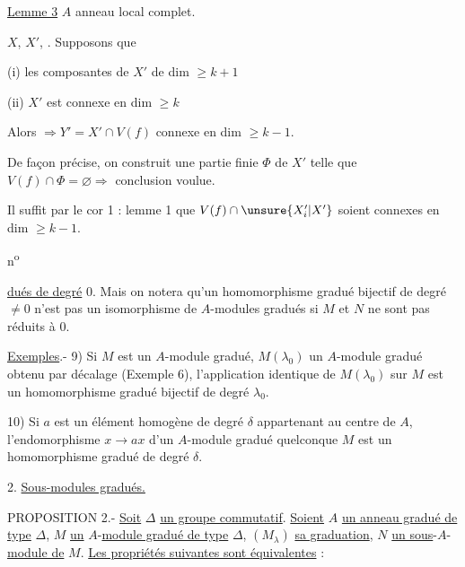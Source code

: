\uline{Lemme 3} \quad $A$ anneau local   complet. 

$X$, $X'$, \deleted{[$Y'=V(f)\cap X'$]}. Supposons  que

(i) les composantes de $X'$ de dim $\geq k+1$

(ii) $X'$ est connexe en dim $\geq k$

Alors   $\Longrightarrow Y'=X'\cap V(f)$   connexe en dim $\geq k-1$.

De façon précise, on construit une partie finie $\Phi$ de $X'$ telle que $V(f)\cap\Phi=\varnothing\Longrightarrow$ conclusion voulue.

Il suffit par le cor 1 : lemme 1 que $V(f)\cap\unsure{X'_i|X'}$ soient connexes en dim $\geq k-1$.

\begin{flushright}
n\textsuperscript{o}
\end{flushright}

\uline{dués de degré} 0. Mais on notera qu'un homomorphisme gradué bijectif de degré $\ne 0$ n'est pas un isomorphisme de $A$-modules gradués si $M$ et $N$ ne sont pas réduits à 0.

\uline{Exemples}.- 9) Si $M$ est un $A$-module gradué, $M(\lambda_0)$ un $A$-module gradué obtenu par décalage (Exemple 6), l'application identique de $M(\lambda_0)$ sur $M$ est un homomorphisme gradué bijectif de degré $\lambda_0$.

10) Si $a$ est un élément homogène de degré $\delta$ appartenant au centre de $A$, l'endomorphisme $x\to ax$ d'un $A$-module gradué quelconque $M$ est un homomorphisme gradué de degré $\delta$.

2. \uline{Sous-modules gradués.}

PROPOSITION 2.- \uline{Soit} $\Delta$ \uline{un groupe commutatif}. \uline{Soient} $A$ \uline{un anneau gradué de type} $\Delta$, $M$ \uline{un} $A$-\uline{module gradué de type} $\Delta$, $(M_\lambda)$ \uline{sa graduation}, $N$ \uline{un sous}-$A$-\uline{module de} $M$. \uline{Les propriétés suivantes sont équivalentes} :


